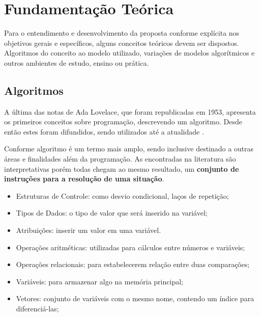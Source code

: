 \ifdraft{\color{green}}{}\chapter{Fundamentação Teórica}

Para o entendimento e desenvolvimento da proposta conforme explícita nos objetivos gerais e específicos, alguns conceitos teóricos devem ser dispostos. Algoritmos do conceito ao modelo utilizado, variações de modelos algorítmicos e outros ambientes de estudo, ensino ou prática.

\section{Algoritmos}

A última das notas de Ada Lovelace, que foram republicadas em 1953\nocite{1253887}, apresenta os
primeiros conceitos sobre programação, descrevendo um algoritmo. Desde então
estes foram difundidos, sendo utilizados até a atualidade
\cite{santiago2003etal}.

Conforme  algoritmo é um termo mais amplo, sendo inclusive destinado a outras áreas e finalidades além da programação. As encontradas na literatura são interpretativas porém todas chegam ao mesmo resultado, um {\bfseries conjunto de instruções para a resolução de uma situação}.



\begin{itemize}
\item Estruturas de Controle: como desvio condicional, laços de repetição;
\item Tipos de Dados: o tipo de valor que será inserido na variável;
\item Atribuições: inserir um valor em uma variável.
\item Operações aritméticas: utilizadas para cálculos entre números e variáveis;
\item Operações relacionais: para estabelecerem relação entre duas comparações;
\item Variáveis: para armazenar algo na memória principal;
\item Vetores: conjunto de variáveis com o mesmo nome, contendo um índice para diferenciá-las;
\end{itemize}

